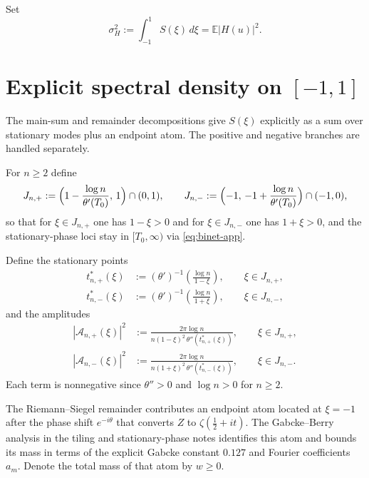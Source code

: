 \documentclass[11pt]{article}
\begin{document}
Set
\begin{equation}
\sigma_{H}^{2}
:=
\int_{-1}^{1} S(\xi)\,d\xi
=
\mathbb{E}|H(u)|^{2}.
\label{eq:sigmaH-app}
\end{equation}

\section{Explicit spectral density on \texorpdfstring{$[-1,1]$}{[-1,1]}}

The main-sum and remainder decompositions give $S(\xi)$ explicitly as a
sum over stationary modes plus an endpoint atom. The positive and
negative branches are handled separately. \cite{SpectralTiling,StationaryPhase}

For $n\ge 2$ define
\[
J_{n,+}
:=
\Bigl(1-\frac{\log n}{\theta'(T_{0})},\,1\Bigr)\cap(0,1),
\qquad
J_{n,-}
:=
\Bigl(-1,\,-1+\frac{\log n}{\theta'(T_{0})}\Bigr)\cap(-1,0),
\]
so that for $\xi\in J_{n,+}$ one has $1-\xi>0$ and for
$\xi\in J_{n,-}$ one has $1+\xi>0$, and the stationary-phase loci stay in
$[T_{0},\infty)$ via \eqref{eq:binet-app}. \cite{StationaryPhase}

Define the stationary points
\begin{align}
t^{*}_{n,+}(\xi)
&:=
(\theta')^{-1}\!\left(\frac{\log n}{1-\xi}\right),
\qquad \xi\in J_{n,+},
\label{eq:tstar-plus}
\\
t^{*}_{n,-}(\xi)
&:=
(\theta')^{-1}\!\left(\frac{\log n}{1+\xi}\right),
\qquad \xi\in J_{n,-},
\label{eq:tstar-minus}
\end{align}
and the amplitudes
\begin{align}
|\mathcal{A}_{n,+}(\xi)|^{2}
&:=
\frac{2\pi\log n}{n(1-\xi)^{2}\,\theta''(t^{*}_{n,+}(\xi))},
\qquad \xi\in J_{n,+},
\label{eq:Aplus}
\\
|\mathcal{A}_{n,-}(\xi)|^{2}
&:=
\frac{2\pi\log n}{n(1+\xi)^{2}\,\theta''(t^{*}_{n,-}(\xi))},
\qquad \xi\in J_{n,-}.
\label{eq:Aminus}
\end{align}
Each term is nonnegative since $\theta''>0$ and $\log n>0$ for $n\ge 2$.
\cite{StationaryPhase}

The Riemann–Siegel remainder contributes an endpoint atom located at
$\xi=-1$ after the phase shift $e^{-i\theta}$ that converts $Z$ to
$\zeta(\tfrac12+it)$. The Gabcke–Berry analysis in the tiling and
stationary-phase notes identifies this atom and bounds its mass in terms
of the explicit Gabcke constant $0.127$ and Fourier coefficients
$a_{m}$. \cite{SpectralTiling,StationaryPhase} Denote the total mass of
that atom by $w\ge 0$.
\end{document}
